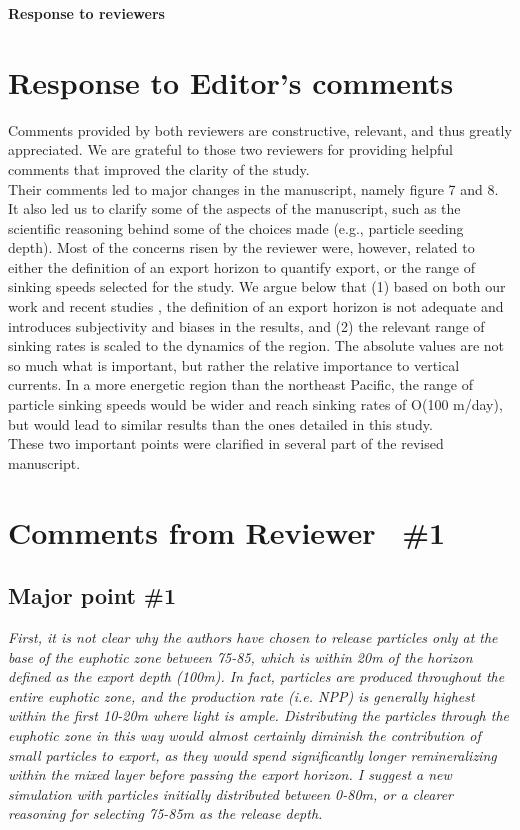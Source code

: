 \documentclass[12pt,letter]{article}
\begin{document}
\begin{center}
\large
\textbf{
Response to reviewers\\}
\end{center}
\small
	
\section{Response to Editor's comments}


Comments provided by both reviewers are constructive, relevant, and thus greatly appreciated. We are grateful to those two reviewers for providing helpful comments that improved the clarity of the study.\\

Their comments led to major changes in the manuscript, namely figure 7 and 8. It also led us to clarify some of the aspects of the manuscript, such as the scientific reasoning behind some of the choices made (e.g., particle seeding depth). Most of the concerns risen by the reviewer were, however, related to either the definition of an export horizon to quantify export, or the range of sinking speeds selected for the study. We argue below that (1) based on both our work and recent studies \citep{Palevsky_2018}, the definition of an export horizon is not adequate and introduces subjectivity and biases in the results, and (2) the relevant range of sinking rates is scaled to the dynamics of the region. The absolute values are not so much what is important, but rather the relative importance to vertical currents. In a more energetic region than the northeast Pacific, the range of particle sinking speeds would be wider and reach sinking rates of O(100 m/day), but would lead to similar results than the ones detailed in this study.\\

These two important points were clarified in several part of the revised manuscript.

\section{Comments from Reviewer  \#1}
\subsection*{Major point \#1}
\small
\textit{First, it is not clear why the authors have chosen to release particles only at the base of the euphotic zone between 75-85, which is within 20m of the horizon defined as the export depth (100m). In fact, particles are produced throughout the entire euphotic zone, and the production rate (i.e. NPP) is generally highest within the first 10-20m where light is ample. Distributing the particles through the euphotic zone in this way would almost certainly diminish the contribution of small particles to export, as they would spend significantly longer remineralizing within the mixed layer before passing the export horizon. I suggest a new simulation with particles initially distributed between 0-80m, or a clearer reasoning for selecting 75-85m as the release depth.\\}
\end{document}
